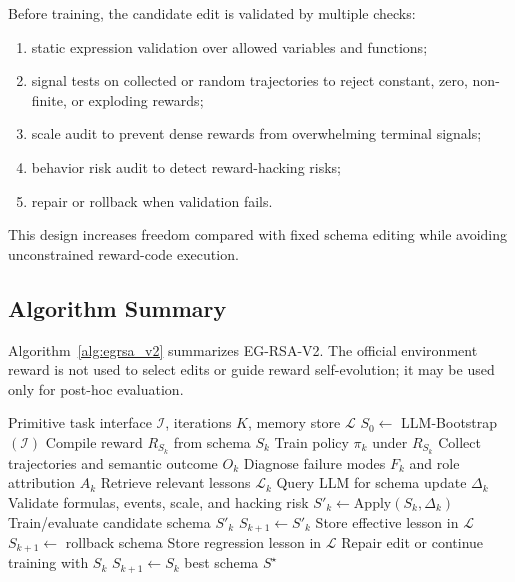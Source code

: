 \documentclass[11pt]{article}
\begin{document}
Before training, the candidate edit is validated by multiple checks:

\begin{enumerate}[leftmargin=*,nosep]
    \item static expression validation over allowed variables and functions;
    \item signal tests on collected or random trajectories to reject constant, zero, non-finite, or exploding rewards;
    \item scale audit to prevent dense rewards from overwhelming terminal signals;
    \item behavior risk audit to detect reward-hacking risks;
    \item repair or rollback when validation fails.
\end{enumerate}

This design increases freedom compared with fixed schema editing while avoiding unconstrained reward-code execution.

\subsection{Algorithm Summary}

Algorithm~\ref{alg:egrsa_v2} summarizes EG-RSA-V2. The official environment reward is not used to select edits or guide reward self-evolution; it may be used only for post-hoc evaluation.

\begin{algorithm}[t]
\caption{EG-RSA-V2: LLM-Bootstrapped Reward Self-Evolution}
\label{alg:egrsa_v2}
\begin{algorithmic}[1]
\Require Primitive task interface $\mathcal{I}$, iterations $K$, memory store $\mathcal{L}$
\State $S_0 \gets$ LLM-Bootstrap$(\mathcal{I})$
    \State Compile reward $R_{S_k}$ from schema $S_k$
    \State Train policy $\pi_k$ under $R_{S_k}$
    \State Collect trajectories and semantic outcome $O_k$
    \State Diagnose failure modes $F_k$ and role attribution $A_k$
    \State Retrieve relevant lessons $\mathcal{L}_k$
    \State Query LLM for schema update $\Delta_k$
    \State Validate formulas, events, scale, and hacking risk
        \State $S'_k \gets \mathrm{Apply}(S_k,\Delta_k)$
        \State Train/evaluate candidate schema $S'_k$
            \State $S_{k+1} \gets S'_k$
            \State Store effective lesson in $\mathcal{L}$
        \Else
            \State $S_{k+1} \gets$ rollback schema
            \State Store regression lesson in $\mathcal{L}$
        \EndIf
    \Else
        \State Repair edit or continue training with $S_k$
        \State $S_{k+1} \gets S_k$
    \EndIf
\EndFor
\State \Return best schema $S^\star$
\end{algorithmic}
\end{algorithm}
\end{document}
